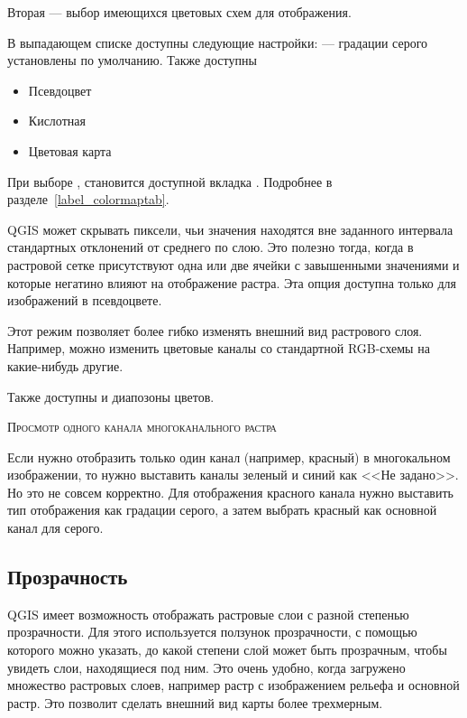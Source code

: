 Вторая --- выбор имеющихся цветовых схем для отображения.

В выпадающем списке доступны следующие настройки:
 --- градации серого
установлены по умолчанию. Также доступны
\begin{itemize}[label=--]
\item Псевдоцвет
\item Кислотная
\item Цветовая карта
\end{itemize}

При выборе , становится
доступной вкладка . Подробнее в разделе~\ref{label_colormaptab}.

QGIS может скрывать пиксели, чьи значения находятся вне заданного
интервала стандартных отклонений от среднего по слою.
Это полезно тогда, когда в растровой сетке присутствуют одна или две ячейки
с завышенными значениями и которые негатино влияют на отображение растра.
Эта опция доступна только для изображений в псевдоцвете.


Этот режим позволяет более гибко изменять внешний вид растрового слоя. %
Например, можно изменить цветовые каналы со стандартной RGB-схемы на
какие-нибудь другие.

Также доступны и диапозоны цветов.


\begin{Tip}\caption{\textsc{Просмотр одного канала многоканального растра}}
Если нужно отобразить только один канал (например, красный) в
многокальном изображении, то нужно выставить каналы зеленый и синий как
<<Не задано>>. Но это не совсем корректно. Для отображения красного
канала нужно выставить тип отображения как градации серого, а затем
выбрать красный как основной канал для серого.
\end{Tip}

\subsection{Прозрачность} \label{rastertab:transparency}

QGIS имеет возможность отображать растровые слои с разной степенью
прозрачности. Для этого используется
ползунок прозрачности, с помощью которого можно указать, до какой
степени слой может быть прозрачным, чтобы увидеть слои, находящиеся под
ним. Это очень удобно, когда загружено множество растровых слоев,
например растр с изображением рельефа и основной растр. Это позволит
сделать внешний вид карты более трехмерным.

